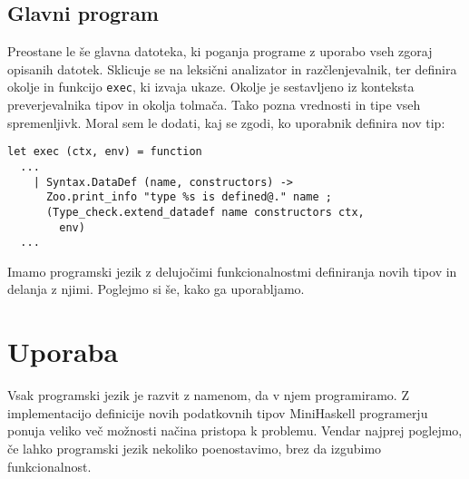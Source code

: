 \documentclass[12pt,a4paper,openany]{book}
\begin{document}
\section{Glavni program}
Preostane le še glavna datoteka, ki poganja programe z uporabo vseh zgoraj opisanih datotek. Sklicuje se na leksični analizator in razčlenjevalnik, ter definira okolje in funkcijo \lstinline{exec}, ki izvaja ukaze. Okolje je sestavljeno 
iz konteksta preverjevalnika tipov in okolja tolmača. Tako pozna vrednosti in tipe vseh spremenljivk. Moral sem le dodati, kaj se zgodi, ko uporabnik definira nov tip:
\begin{lstlisting}
let exec (ctx, env) = function
  ...
    | Syntax.DataDef (name, constructors) ->
      Zoo.print_info "type %s is defined@." name ;
      (Type_check.extend_datadef name constructors ctx,
        env)
  ...
\end{lstlisting}

Imamo programski jezik z delujočimi funkcionalnostmi definiranja novih tipov in delanja z njimi. Poglejmo si še, kako ga uporabljamo.

\chapter{Uporaba}
Vsak programski jezik je razvit z namenom, da v njem programiramo. Z implementacijo definicije novih podatkovnih tipov MiniHaskell programerju 
ponuja veliko več možnosti načina pristopa k problemu. Vendar najprej poglejmo, če lahko programski jezik nekoliko poenostavimo, brez da izgubimo funkcionalnost. 
\end{document}
